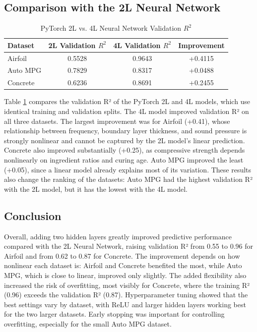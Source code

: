 \documentclass{article}
\begin{document}
\subsection{Comparison with the 2L Neural Network}
\begin{table}[H]
    \centering
    \caption{PyTorch 2L vs. 4L Neural Network Validation $R^2$}
    \label{tab:pytorch_2l_vs_4l}
    \begin{tabular}{lccc}
        \hline
        \textbf{Dataset} & \textbf{2L Validation $R^2$} & \textbf{4L Validation $R^2$} & \textbf{Improvement} \\
        \hline
        Airfoil  & 0.5528 & 0.9643 & +0.4115 \\
        Auto MPG & 0.7829 & 0.8317 & +0.0488 \\
        Concrete & 0.6236 & 0.8691 & +0.2455 \\
        \hline
    \end{tabular}
\end{table}

Table \ref{tab:pytorch_2l_vs_4l} compares the validation R² of the PyTorch 2L and 4L models, which use identical training and validation splits. The 4L model improved validation R² on all three datasets. The largest improvement was for Airfoil (+0.41), whose relationship between frequency, boundary layer thickness, and sound pressure is strongly nonlinear and cannot be captured by the 2L model's linear prediction. Concrete also improved substantially (+0.25), as compressive strength depends nonlinearly on ingredient ratios and curing age. Auto MPG improved the least (+0.05), since a linear model already explains most of its variation. These results also change the ranking of the datasets: Auto MPG had the highest validation R² with the 2L model, but it has the lowest with the 4L model.

\subsection{Conclusion}
Overall, adding two hidden layers greatly improved predictive performance compared with the 2L Neural Network, raising validation R² from 0.55 to 0.96 for Airfoil and from 0.62 to 0.87 for Concrete. The improvement depends on how nonlinear each dataset is: Airfoil and Concrete benefited the most, while Auto MPG, which is close to linear, improved only slightly. The added flexibility also increased the risk of overfitting, most visibly for Concrete, where the training R² (0.96) exceeds the validation R² (0.87). Hyperparameter tuning showed that the best settings vary by dataset, with ReLU and larger hidden layers working best for the two larger datasets. Early stopping was important for controlling overfitting, especially for the small Auto MPG dataset.
\end{document}
